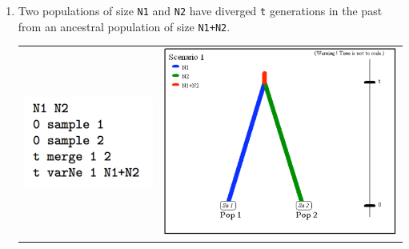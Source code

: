\begin{enumerate}
\item Two populations of size \texttt{N1} and \texttt{N2} have diverged \texttt{t} generations
in the past from an ancestral population of size \texttt{N1+N2}.\\
\begin{center} 
\begin{tabular}{cc}
\includegraphics[scale=0.5]{code_scenario_02.pdf} & \includegraphics[scale=0.35]{scenario_02.pdf} \\
\end{tabular}
\end{center}



\end{enumerate}
